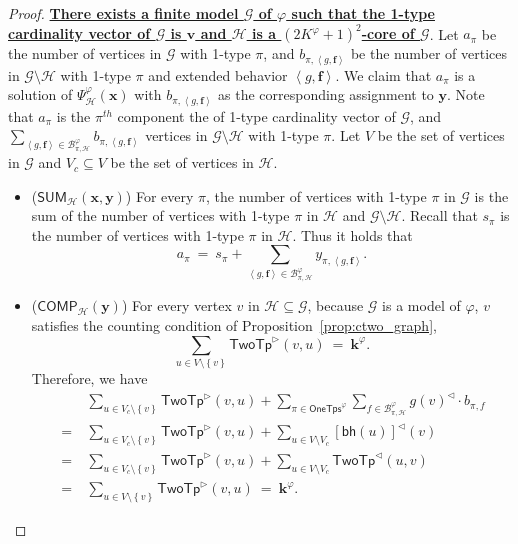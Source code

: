 \documentclass[10pt,a4paper]{article}
\theoremstyle{definition}
\theoremstyle{remark}
\newcommand{\cB}{\mathcal{B}}
\newcommand{\cG}{\mathcal{G}}
\newcommand{\cH}{\mathcal{H}}
\newcommand{\bff}{\mathbf{f}}
\newcommand{\bfk}{\mathbf{k}}
\newcommand{\bfv}{\mathbf{v}}
\newcommand{\bfx}{\mathbf{x}}
\newcommand{\bfy}{\mathbf{y}}
\newcommand{\twotypeof}{\mathsf{TwoTp}}
\newcommand{\onetypes}{\mathsf{OneTps}}
\newcommand{\set}[1]         {\left\{ #1 \right\}}
\newcommand{\tuple}[1]       {\left\langle #1 \right\rangle}
\newcommand{\bh}[1] {\mathsf{bh}\left( #1 \right)}
\newcommand{\trif} {\triangleright}
\newcommand{\trib} {\triangleleft}
\newcommand{\summ}  {\mathsf{SUM}}
\newcommand{\comp}  {\mathsf{COMP}}
\begin{document}
\begin{proof}
    \textbf{\uline{There exists a finite model $\cG$ of $\varphi$ such that the 1-type cardinality vector of $\cG$ is $\bfv$ and $\cH$ is a $(2K^\varphi + 1)^2$-core of $\cG$}}.
    Let $a_{\pi}$ be the number of vertices in $\cG$ with 1-type $\pi$, and
    $b_{\pi, \tuple{g, \bff}}$ be the number of vertices in $\cG \setminus \cH$ with 1-type $\pi$ and extended behavior $\tuple{g, \bff}$.
    We claim that $a_\pi$ is a solution of $\Psi^\varphi_{\cH}(\bfx)$ with $b_{\pi, \tuple{g, \bff}}$ as the corresponding assignment to $\bfy$.
    Note that $a_\pi$ is the $\pi^{th}$ component the of 1-type cardinality vector of $\cG$,
    and
    $\sum_{\tuple{g, \bff} \in \cB^\varphi_{\pi, \cH}} b_{\pi, \tuple{g, \bff}}$ vertices in $\cG \setminus \cH$ with 1-type $\pi$.
    Let $V$ be the set of vertices in $\cG$ and $V_c \subseteq V$ be the set of vertices in $\cH$.
    \begin{itemize}
        \item ($\summ_{\cH}(\bfx, \bfy)$)
            For every $\pi$, the number of vertices with 1-type $\pi$ in $\cG$
            is the sum of the number of vertices with 1-type $\pi$ in $\cH$ and $\cG \setminus \cH$.
            Recall that $s_\pi$ is the number of vertices with 1-type $\pi$ in $\cH$.
            Thus it holds that
            \begin{equation*}
                a_\pi\ =\ s_\pi + \sum_{\tuple{g, \bff} \in \cB^\varphi_{\pi, \cH}} y_{\pi, \tuple{g, \bff}}.
            \end{equation*}

        \item ($\comp_{\cH}(\bfy)$)
        For every vertex $v$ in $\cH \subseteq \cG$,
        because $\cG$ is a model of $\varphi$, $v$ satisfies the counting condition of Proposition~\ref{prop:ctwo_graph},
        \begin{equation*}
            \sum_{u \in V \setminus \set{v}} \twotypeof^\trif(v, u)
                \ =\ 
            \bfk^\varphi.
        \end{equation*}
        Therefore, we have
        \begin{equation*}
            \begin{aligned}
                &
                \sum_{u \in V_c \setminus \set{v}} \twotypeof^\trif(v, u) +
                \sum_{\pi \in \onetypes^\varphi} \sum_{f \in \cB^\varphi_{\pi, \cH}} g(v)^\trib \cdot b_{\pi, f} \\
                \ =\ &
                \sum_{u \in V_c \setminus \set{v}} \twotypeof^\trif(v, u) +
                \sum_{u \in V \setminus V_c} [\bh{u}]^\trib(v) \\
                \ =\ &
                \sum_{u \in V_c \setminus \set{v}} \twotypeof^\trif(v, u) +
                \sum_{u \in V \setminus V_c} \twotypeof^\trib(u, v) \\
                \ =\ &
                \sum_{u \in V \setminus \set{v}} \twotypeof^\trif(v, u)
                \ =\ 
                \bfk^\varphi.
            \end{aligned}
        \end{equation*}


\end{itemize}
\end{proof}
\end{document}

